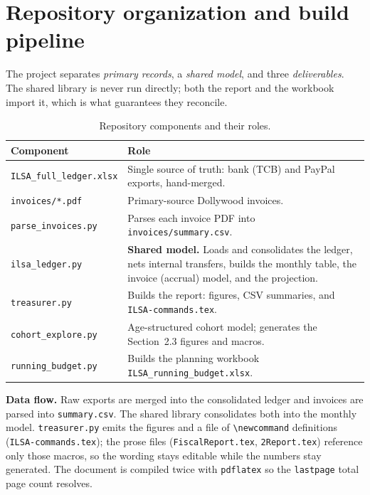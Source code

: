 \section{Repository organization and build pipeline}

The project separates \emph{primary records}, a \emph{shared model}, and three
\emph{deliverables}. The shared library is never run directly; both the report
and the workbook import it, which is what guarantees they reconcile.

\begin{table}[h]
\centering
\small
\begin{tabular}{|l|p{9.2cm}|}
\hline
\textbf{Component} & \textbf{Role} \\
\hline
\texttt{ILSA\_full\_ledger.xlsx} & Single source of truth: bank (TCB) and PayPal exports, hand-merged. \\
\texttt{invoices/*.pdf} & Primary-source Dollywood invoices. \\
\texttt{parse\_invoices.py} & Parses each invoice PDF into \texttt{invoices/summary.csv}. \\
\texttt{ilsa\_ledger.py} & \textbf{Shared model.} Loads and consolidates the ledger, nets internal transfers, builds the monthly table, the invoice (accrual) model, and the projection. \\
\texttt{treasurer.py} & Builds the report: figures, CSV summaries, and \texttt{ILSA-commands.tex}. \\
\texttt{cohort\_explore.py} & Age-structured cohort model; generates the Section~2.3 figures and macros. \\
\texttt{running\_budget.py} & Builds the planning workbook \texttt{ILSA\_running\_budget.xlsx}. \\
\hline
\end{tabular}
\caption{Repository components and their roles.}
\end{table}

\noindent\textbf{Data flow.} Raw exports are merged into the consolidated ledger
and invoices are parsed into \texttt{summary.csv}. The shared library consolidates
both into the monthly model. \texttt{treasurer.py} emits the figures and a file of
\verb|\newcommand| definitions (\texttt{ILSA-commands.tex}); the prose files
(\texttt{FiscalReport.tex}, \texttt{2Report.tex}) reference only those macros, so
the wording stays editable while the numbers stay generated. The document is
compiled twice with \texttt{pdflatex} so the \texttt{lastpage} total page count
resolves.

